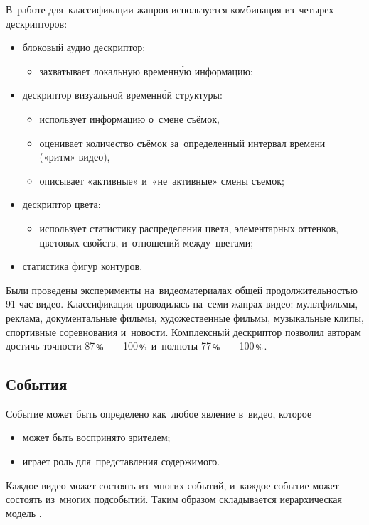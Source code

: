В~работе \cite{Ionescu:2012} для~классификации жанров используется
комбинация из~четырех дескрипторов:
\begin{itemize}
    \item блоковый аудио дескриптор:
    \begin{itemize}
        \item захватывает локальную временну́ю информацию;
    \end{itemize}
    \item дескриптор визуальной временно́й структуры:
    \begin{itemize}
        \item использует информацию о~смене съёмок,
        \item оценивает количество съёмок
            за~определенный интервал времени («ритм» видео),
        \item описывает «активные» и~«не~активные» смены съемок;
    \end{itemize}
    \item дескриптор цвета:
    \begin{itemize}
        \item использует статистику распределения цвета,
        элементарных оттенков, цветовых свойств, и~отношений между~цветами;
    \end{itemize}
    \item статистика фигур контуров.
\end{itemize}

Были проведены эксперименты на~видеоматериалах общей продолжительностью
91 час видео. Классификация проводилась на~семи жанрах видео:
мультфильмы, реклама, документальные фильмы, художественные фильмы,
музыкальные клипы, спортивные соревнования и~новости.
Комплексный дескриптор позволил авторам достичь
точности  87﹪~— 100﹪ и~полноты 77﹪~— 100﹪.

\subsection{События}

Событие может быть определено как~любое явление в~видео,
которое
\begin{itemize}
    \item может быть воспринято зрителем;
    \item играет роль для~представления содержимого.
\end{itemize}
Каждое видео может состоять из~многих событий,
и~каждое событие может состоять из~многих подсобытий.
Таким образом складывается иерархическая модель \cite{Chang:2002}.

